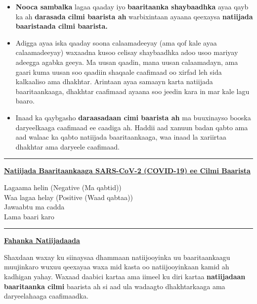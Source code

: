 \documentclass[10pt]{article}
\newcommand{\PageLine}{\rule{\textwidth}{0.25mm}}
\begin{document}
\begin{itemize}
\item

  \textbf{Nooca sambalka} lagaa qaaday iyo \textbf{baaritaanka shaybaadhka} ayaa
  qayb ka ah \textbf{darasada cilmi baarista ah} warbixintaan ayaana qeexaysa
  \textbf{natiijada baaristaada cilmi baarista.}

\item

  Adigga ayaa iska qaaday soona calaamadeeyay (ama qof kale ayaa calaamadeeyay)
  waxaadna kusoo celisay shaybaadhka adoo usoo mariyay adeegga agabka geeya. Ma
  uusan qaadin, mana uusan calaamadayn, ama gaari kuma uusan soo qaadiin
  shaqaale caafimaad oo xirfad leh sida kalkaaliso ama dhakhtar. Arintaan ayaa
  samaayn karta natiijada baaritaankaaga, dhakhtar caafimaad ayaana soo jeedin
  kara in mar kale lagu baaro.

\item

  Inaad ka qaybgasho \textbf{daraasadaan cimi baarista ah} ma buuxinayso booska
  daryeelkaaga caafimaad ee caadiga ah. Haddii aad xanuun badan qabto ama aad
  walaac ka qabto natiijada baaritaankaaga, waa inaad la xariirtaa dhakhtar ama
  daryeele caafimaad.

\end{itemize}

\bigskip
\PageLine

\large \underline{\textbf{Natiijada Baaritaankaaga SARS-CoV-2 (COVID-19) ee
  Cilmi Baarista }}

Lagaama helin (Negative (Ma qabtid))\\
Waa lagaa helay (Positive (Waad qabtaa))\\
Jawaabtu ma cadda\\
Lama baari karo\\

\PageLine
\bigskip

\large \underline{\textbf{Fahanka Natiijadaada}}

Shaxdaan waxay ku siinaysaa dhammaan natiijooyinka uu baaritaankaagu muujinkaro
wuxuu qeexayaa waxa mid kasta oo natiijooyinkaan kamid ah kadhigan yahay. Waxaad
daabici kartaa ama iimeel ku diri kartaa \textbf{natiijadaan baaritaanka cilmi}
baarista ah si aad ula wadaagto dhakhtarkaaga ama daryeelahaaga caafimaadka.
\end{document}

